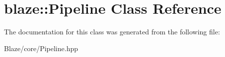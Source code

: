 \hypertarget{classblaze_1_1Pipeline}{}\section{blaze\+:\+:Pipeline Class Reference}
\label{classblaze_1_1Pipeline}


The documentation for this class was generated from the following file\+:\begin{DoxyCompactItemize}
\item 
Blaze/core/Pipeline.\+hpp\end{DoxyCompactItemize}
